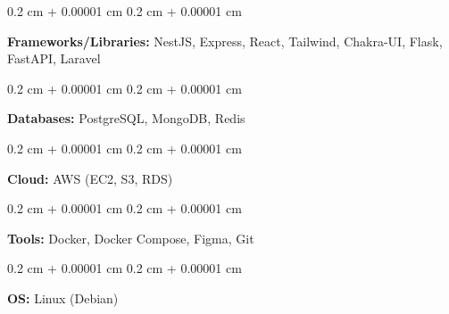 \documentclass[10pt, letterpaper]{article}
\newenvironment{onecolentry}{
    \begin{adjustwidth}{
        0.2 cm + 0.00001 cm
    }{
        0.2 cm + 0.00001 cm
    }
}{
    \end{adjustwidth}
} %
\begin{document}
        \vspace{0.2 cm}

        \begin{onecolentry}
            \textbf{Frameworks/Libraries:} NestJS, Express, React, Tailwind, Chakra-UI, Flask, FastAPI, Laravel
        \end{onecolentry}

        \vspace{0.2 cm}

        \begin{onecolentry}
            \textbf{Databases:} PostgreSQL, MongoDB, Redis
        \end{onecolentry}

        \vspace{0.2 cm}

        \begin{onecolentry}
            \textbf{Cloud:} AWS (EC2, S3, RDS)
        \end{onecolentry}

        \vspace{0.2 cm}
        
        \begin{onecolentry}
            \textbf{Tools:} Docker, Docker Compose, Figma, Git
        \end{onecolentry}

        \vspace{0.2 cm}
        \begin{onecolentry}
            \textbf{OS:} Linux (Debian)
        \end{onecolentry}
\end{document}
